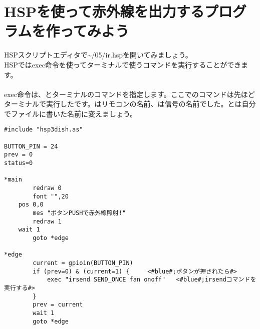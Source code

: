 \newpage
\section{HSPを使って赤外線を出力するプログラムを作ってみよう}
HSPスクリプトエディタで\textasciitilde /05/ir.hspを開いてみましょう。\\
HSPではexec命令を使ってターミナルで使うコマンドを実行することができます。\\
\\
exec命令は、とターミナルのコマンドを指定します。ここでのコマンドは先ほどターミナルで実行したです。\code{\textcolor{red}{fan}}はリモコンの名前、\code{\textcolor{red}{onoff}}は信号の名前でした。\code{\textcolor{red}{fan}}と\code{\textcolor{red}{onoff}}は自分でファイルに書いた名前に変えましょう。\\

\begin{lstlisting}[caption=ir.hsp,label=ir.hsp]
#include "hsp3dish.as"

BUTTON_PIN = 24
prev = 0
status=0

*main
        redraw 0 
        font "",20
	pos 0,0
        mes "ボタンPUSHで赤外線照射!"
        redraw 1
	wait 1
        goto *edge

*edge
        current = gpioin(BUTTON_PIN)
        if (prev=0) & (current=1) {		<#blue#;ボタンが押されたら#>
            exec "irsend SEND_ONCE fan onoff"	<#blue#;irsendコマンドを実行する#>
        }
        prev = current
        wait 1
        goto *edge
\end{lstlisting}

\begin{tcolorbox}[title=\useOmetoi]
\begin{enumerate}
\end{enumerate}
\end{tcolorbox}
